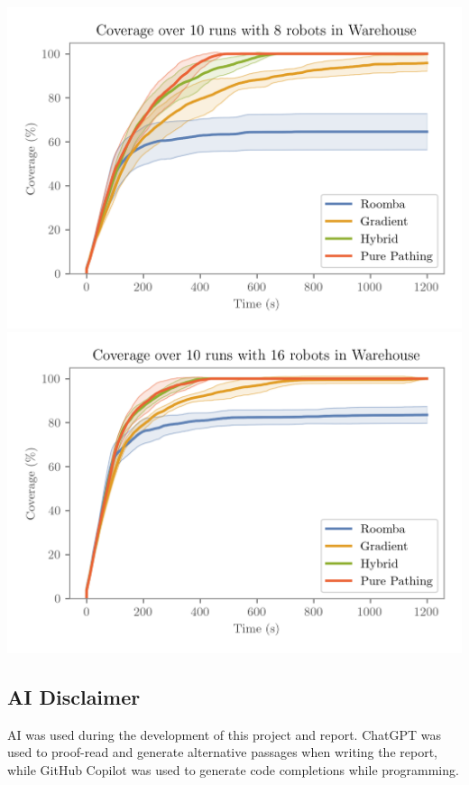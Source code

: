 \hfill
\includegraphics[width=\w]{figures/plots/benchmarks/coverage-over-10-runs-with-8-robots-in-warehouse.png}
\\
\includegraphics[width=\w]{figures/plots/benchmarks/coverage-over-10-runs-with-16-robots-in-warehouse.png}


\subsection{AI Disclaimer}
AI was used during the development of this project and report. ChatGPT was used to proof-read and generate alternative passages when writing the report, while GitHub Copilot was used to generate code completions while programming.


\stopcontents[inner]
